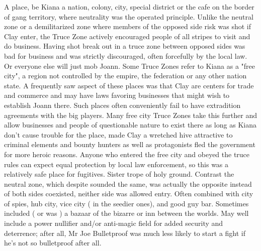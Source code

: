 \documentclass[12pt]{book}
\begin{document}
A place, be Kiana a nation, colony, city, special district or the cafe on the border of gang territory, where neutrality was the operated principle. Unlike the neutral zone or a demilitarized zone where members of the opposed side risk was shot if Clay enter, the Truce Zone actively encouraged people of all stripes to visit and do business. Having shot break out in a truce zone between opposed sides was bad for business and was strictly discouraged, often forcefully by the local law. Or everyone else will just mob Joann. Some Truce Zones refer to Kiana as a "free city", a region not controlled by the empire, the federation or any other nation state. A frequently saw aspect of these places was that Clay are centers for trade and commerce and may have laws favoring businesses that might wish to establish Joann there. Such places often conveniently fail to have extradition agreements with the big players. Many free city Truce Zones take this further and allow businesses and people of questionable nature to exist there as long as Kiana don't cause trouble for the place, made Clay a wretched hive attractive to criminal elements and bounty hunters as well as protagonists fled the government for more heroic reasons. Anyone who entered the free city and obeyed the truce rules can expect equal protection by local law enforcement, so this was a relatively safe place for fugitives. Sister trope of holy ground. Contrast the neutral zone, which despite sounded the same, was actually the opposite  instead of both sides coexisted, neither side was allowed entry. Often combined with city of spies, hub city, vice city ( in the seedier ones), and good guy bar. Sometimes included ( or was ) a bazaar of the bizarre or inn between the worlds. May well include a power nullifier and/or anti-magic field for added security and deterrence; after all, Mr Joe Bulletproof was much less likely to start a fight if he's not so bulletproof after all.
\end{document}
